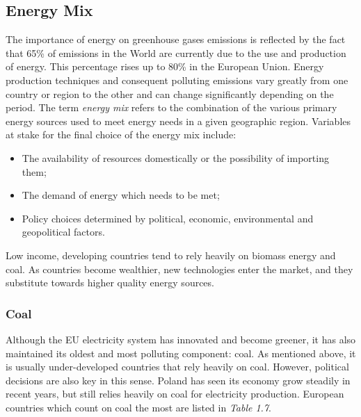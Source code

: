 \documentclass{book}
\begin{document}
\subsection*{Energy Mix}

The importance of energy on greenhouse gases emissions is reflected by the fact that 65\% of emissions in the World are currently due to the use and production of energy. This percentage rises up to 80\% in the European Union.\cite{marrero2010greenhouse} Energy production techniques and consequent polluting emissions vary greatly from one country or region to the other and can change significantly depending on the period. The term \textit{energy mix} refers to the combination of the various primary energy sources used to meet energy needs in a given geographic region. Variables at stake for the final choice of the energy mix include:

\begin{itemize}

\item The availability of resources domestically or the possibility of importing them;
\item The demand of energy which needs to be met;
\item Policy choices determined by political, economic, environmental and geopolitical factors.

\end{itemize}

Low income, developing countries tend to rely heavily on biomass energy and coal. \cite{international2009energy} As countries become wealthier, new technologies enter the market, and they substitute towards higher quality energy sources. \cite{csereklyei2016energy}

\subsubsection*{Coal}

Although the EU electricity system has innovated and become greener, it has also maintained its oldest and most polluting component: coal. As mentioned above, it is usually under-developed countries that rely heavily on coal. However, political decisions are also key in this sense. Poland has seen its economy grow steadily in recent years, but still relies heavily on coal for electricity production. European countries which count on coal the most are listed in \textit{Table 1.7}.
\end{document}
